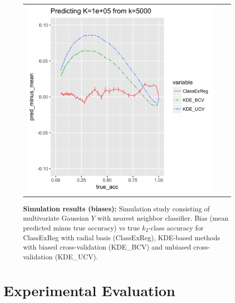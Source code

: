 \documentclass[twoside,11pt]{article}
\begin{document}
\begin{figure}[p]
\begin{tabular}{ccc}
\includegraphics[scale = 0.45, clip = true, trim = .3in 0 0.00in 0.4in]{sim_large7_biaz_K100_k5.png}\\
\end{tabular}
\caption{\textbf{Simulation results (biases):} Simulation study
  consisting of multivariate Gaussian $Y$ with nearest neighbor
  classifier.  Bias (mean predicted minus true accuracy) vs true $k_2$-class accuracy
  for ClassExReg with radial basis (\textsf{ClassExReg}), KDE-based methods with biased cross-validation (\textsf{KDE\_BCV}) and unbiased cross-validation (\textsf{KDE\_UCV}).}
\label{fig:sim_study_bias}
\end{figure}





\section{Experimental Evaluation}\label{sec:extrapolation_example}
\end{document}
